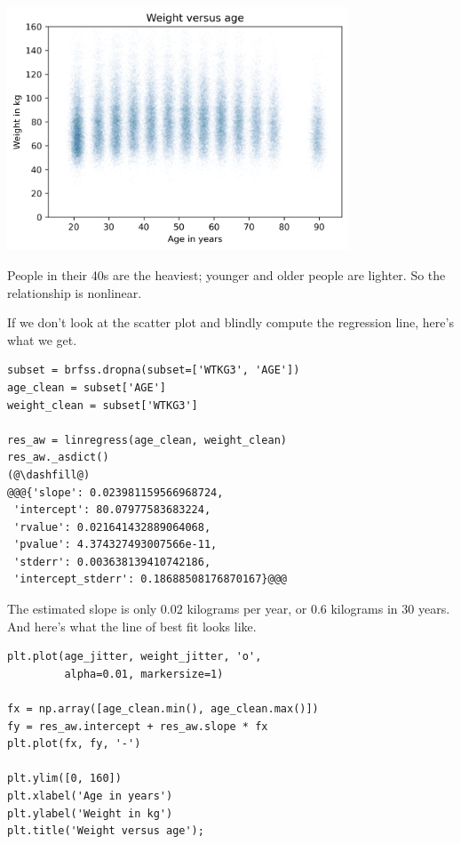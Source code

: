 \begin{center}
\includegraphics[width=4in]{09_relationships_files/09_relationships_103_0.png}
\end{center}

People in their 40s are the heaviest; younger and older people are
lighter. So the relationship is nonlinear.

If we don't look at the scatter plot and blindly compute the regression
line, here's what we get.

\begin{lstlisting}[]
subset = brfss.dropna(subset=['WTKG3', 'AGE'])
age_clean = subset['AGE']
weight_clean = subset['WTKG3']

res_aw = linregress(age_clean, weight_clean)
res_aw._asdict()
(@\dashfill@)
@@@{'slope': 0.023981159566968724,
 'intercept': 80.07977583683224,
 'rvalue': 0.021641432889064068,
 'pvalue': 4.374327493007566e-11,
 'stderr': 0.003638139410742186,
 'intercept_stderr': 0.18688508176870167}@@@
\end{lstlisting}

The estimated slope is only 0.02 kilograms per year, or 0.6 kilograms in
30 years. And here's what the line of best fit looks like.

\begin{lstlisting}[]
plt.plot(age_jitter, weight_jitter, 'o', 
         alpha=0.01, markersize=1)

fx = np.array([age_clean.min(), age_clean.max()])
fy = res_aw.intercept + res_aw.slope * fx
plt.plot(fx, fy, '-')

plt.ylim([0, 160])
plt.xlabel('Age in years')
plt.ylabel('Weight in kg')
plt.title('Weight versus age');
\end{lstlisting}

